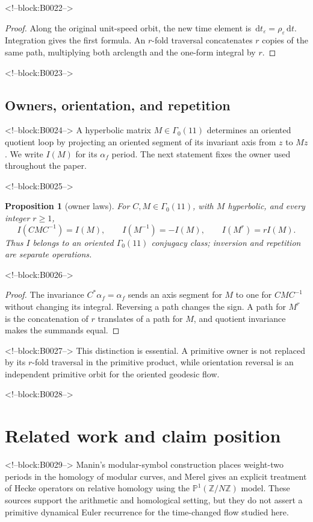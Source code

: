 \documentclass[11pt]{article}
\newtheorem{proposition}[theorem]{Proposition}
\theoremstyle{definition}
\theoremstyle{remark}
\newcommand{\G}{\Gamma_0(11)}
\newcommand{\e}{\varepsilon}
\newcommand{\dd}{\,\mathrm d}
\begin{document}
<!--block:B0022-->
\begin{proof}
Along the original unit-speed orbit, the new time element is $\dd t_\e=\rho_\e\dd t$. Integration gives the first formula. An $r$-fold traversal concatenates $r$ copies of the same path, multiplying both arclength and the one-form integral by $r$.
\end{proof}

<!--block:B0023-->
\subsection{Owners, orientation, and repetition}

<!--block:B0024-->
A hyperbolic matrix $M\in\G$ determines an oriented quotient loop by projecting an oriented segment of its invariant axis from $z$ to $Mz$. We write $I(M)$ for its $\alpha_f$ period. The next statement fixes the owner used throughout the paper.

<!--block:B0025-->
\begin{proposition}[owner laws]\label{prop:owner}
For $C,M\in\G$, with $M$ hyperbolic, and every integer $r\geq1$,
\[
I(CMC^{-1})=I(M),\qquad I(M^{-1})=-I(M),\qquad I(M^r)=rI(M).
\]
Thus $I$ belongs to an oriented $\G$ conjugacy class; inversion and repetition are separate operations.
\end{proposition}

<!--block:B0026-->
\begin{proof}
The invariance $C^*\alpha_f=\alpha_f$ sends an axis segment for $M$ to one for $CMC^{-1}$ without changing its integral. Reversing a path changes the sign. A path for $M^r$ is the concatenation of $r$ translates of a path for $M$, and quotient invariance makes the summands equal.
\end{proof}

<!--block:B0027-->
This distinction is essential. A primitive owner is not replaced by its $r$-fold traversal in the primitive product, while orientation reversal is an independent primitive orbit for the oriented geodesic flow.

<!--block:B0028-->
\section{Related work and claim position}

<!--block:B0029-->
Manin's modular-symbol construction places weight-two periods in the homology of modular curves, and Merel gives an explicit treatment of Hecke operators on relative homology using the $\mathbb P^1(\mathbb Z/N\mathbb Z)$ model.
\citep[Introduction and Sections~1--2]{merel1991}
These sources support the arithmetic and homological setting, but they do not assert a primitive dynamical Euler recurrence for the time-changed flow studied here.
\end{document}
